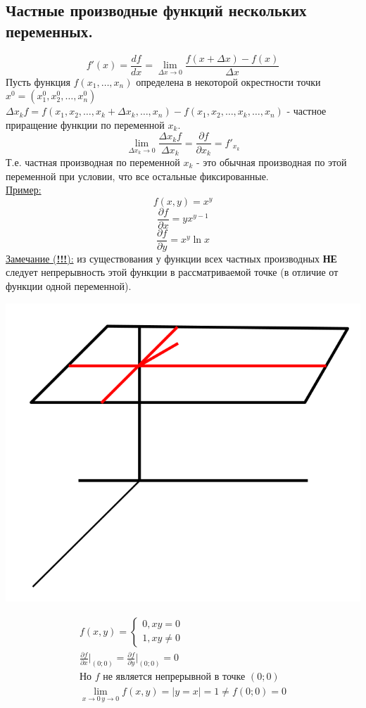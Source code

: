 \documentclass[12pt]{article}
\let\ORIincludegraphics\includegraphics
\renewcommand{\includegraphics}[2][]{\ORIincludegraphics[scale=0.65,#1]{#2}}
\begin{document}
    \subsection{Частные производные функций нескольких переменных.}
    \[ f'(x) = \frac{df}{dx} = \lim_{\Delta x \to 0}\frac{f(x+\Delta x) - f(x)}{\Delta x} \]
    Пусть функция $f(x_1, \dots, x_n)$ определена в некоторой окрестности точки $x^0 = (x^0_1, x^0_2, \dots, x^0_n)$\\
    $\Delta x_k f = f(x_1, x_2, \dots, x_k + \Delta x_k, \dots, x_n) - f(x_1, x_2, \dots, x_k, \dots, x_n)$ - частное приращение функции по переменной $x_k$.
    \[ \lim_{\Delta x_k \to 0} \frac{\Delta x_k f}{\Delta x_k} = \frac{\partial f}{\partial x_k} = f'_{x_k} \]
    Т.е. частная производная по переменной $x_k$ - это обычная производная по этой переменной при условии, что все остальные фиксированные.\\
    \underline{Пример:}
    \[ f(x,y) = x^y \]
    \[ \frac{\partial f}{\partial x} = yx^{y-1} \]
    \[ \frac{\partial f}{\partial y} = x^y \ln x \]
    \underline{Замечание (\textbf{!!!}):} из существования у функции всех частных производных \textbf{НЕ} следует непрерывность этой функции в рассматриваемой точке (в отличие от функции одной переменной).
    \begin{center}
        \includegraphics{7.4.1.png}
    \end{center}
    \begin{gather*}
        f(x, y) = \begin{cases}
            0, xy = 0\\
            1, xy \ne 0
        \end{cases}\\
        \frac{\partial f}{\partial x} \Big|_{(0; 0)} = \frac{\partial f}{\partial y} \Big|_{(0; 0)} = 0\\
        \text{Но } f \text{ не является непрерывной в точке } (0; 0)\\
        \lim_{x\to 0\, y\to 0}f(x,y) = | y = x | = 1 \ne f(0;0) = 0
    \end{gather*}
\end{document}
